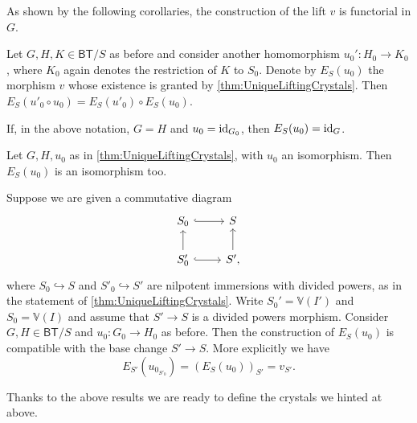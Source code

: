 \noindent
As shown by the following corollaries, the construction of the lift \(v\)
is functorial in \(G\).
\begin{cor}\label{thm:M4.2.4.1}
	Let $G, H, K \in \mathsf{BT}/S$ as before and consider another
	homomorphism $u_0'\colon H_0 \to K_0$, where $K_0$ again denotes
	the restriction of $K$ to $S_0$.
	Denote by $E_S(u_0)$ the morphism $v$ whose existence is granted
	by \cref{thm:UniqueLiftingCrystals}.
	Then $E_S(u'_0 \circ u_0) = E_S(u'_0) \circ E_S(u_0)$.
\end{cor} 


\begin{cor}\label{thm:M4.2.4.2}
	If, in the above notation, $G = H$ and $u_0 = \operatorname{id}_{ G_0 }$,
	then $E_S(u_0) = \operatorname{id}_{ G }$.
\end{cor} 


\begin{cor}\label{thm:M4.2.4.3}
	Let $G,H, u_0$ as in \cref{thm:UniqueLiftingCrystals},
	with $u_0$ an isomorphism.
	Then $E_S(u_0)$ is an isomorphism too.
\end{cor} 


\begin{cor}\label{thm:M4.2.4.4}
	Suppose we are given a commutative diagram
	\begin{equation*}
	\begin{tikzcd}
		S_0 \arrow[r, "", hookrightarrow] &
		S \\
		S_0' \arrow[u, "", rightarrow] 
		\arrow[r, "", hookrightarrow] &
		S' \arrow[u, "", rightarrow] 
	,\end{tikzcd}
	\end{equation*}
	where $S_0 \hookrightarrow S$ and $S'_0 \hookrightarrow S'$ are
	nilpotent immersions with divided powers,
	as in the statement of \cref{thm:UniqueLiftingCrystals}.
	Write $S_0' = \mathbb{V}(I')$ and $S_0 = \mathbb{V}(I)$
	and assume that $S' \to S$ is a divided powers morphism.
	Consider $G,H \in \mathsf{BT}/S$ and $u_0\colon G_0 \to H_0$ as before.
	Then the construction of $E_S(u_0)$ is compatible with the base
	change $S' \to S$.
	More explicitly we have
	\begin{equation*}
		E_{S'}(u_{0_{S'_0}}) =
		\left( E_S(u_0) \right)_{S'} = v_{S'}
	.\end{equation*}
\end{cor} 


\noindent
Thanks to the above results we are ready to define the crystals we hinted at above.


